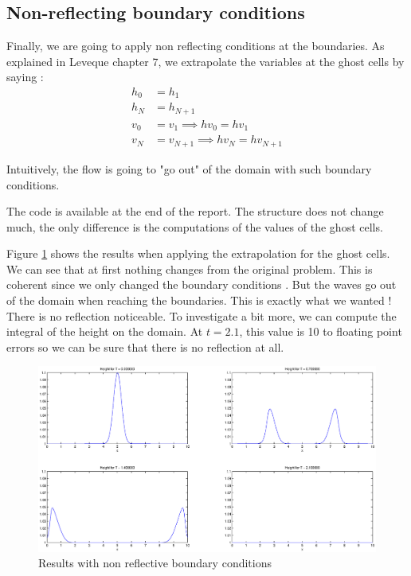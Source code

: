 \subsection{Non-reflecting boundary conditions}
Finally, we are going to apply non reflecting conditions at the boundaries. As explained in Leveque chapter 7, we extrapolate the variables at the ghost cells by saying :
\begin{align*}
h_0 &= h_1\\
h_N &= h_{N+1}\\
v_0 &= v_1 \implies hv_0 = hv_1\\
v_N &= v_{N+1} \implies hv_N = hv_{N+1}
\end{align*}

Intuitively, the flow is going to "go out" of the domain with such boundary conditions.

The code is available at the end of the report. The structure does not change much, the only difference is the computations of the values of the ghost cells.

Figure \ref{noRe} shows the results when applying the extrapolation for the ghost cells. We can see that at first nothing changes from the original problem. This is coherent since we only changed the boundary conditions . But the waves go out of the domain when reaching the boundaries. This is exactly what we wanted ! There is no reflection noticeable. To investigate a bit more, we can compute the integral of the height on the domain. At $t=2.1$, this value is 10 to floating point errors so we can be sure that there is no reflection at all.

\begin{figure}
\begin{center}
\includegraphics[scale=0.4]{noRe.eps}
\caption{Results with non reflective boundary conditions}
\label{noRe}
\end{center}
\end{figure} 